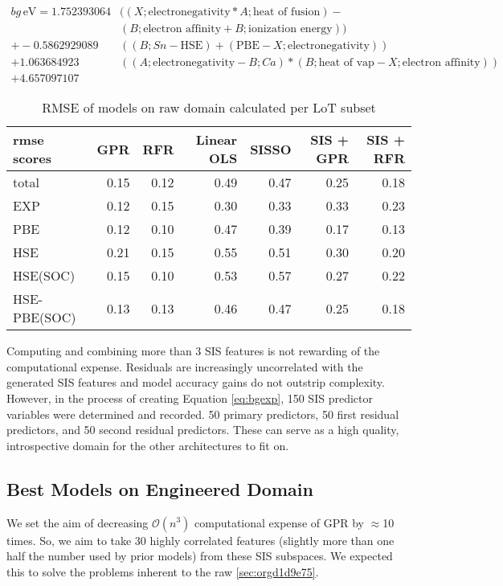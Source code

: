 \begin{align}
\label{eq:bgexp}
bg\,\si{\electronvolt} = 1.752393064 &((X;\mbox{electronegativity}*A;\mbox{heat of fusion})-\nonumber\\&(B;\mbox{electron affinity}+B;\mbox{ionization energy}))\nonumber\\+-0.5862929089 &((B;Sn-\mbox{HSE})+(\mbox{PBE}-X;\mbox{electronegativity}))\nonumber\\+1.063684923 &((A;\mbox{electronegativity}-B;Ca)*(B;\mbox{heat of vap}-X;\mbox{electron affinity}))\nonumber\\+4.657097107
\end{align}

\begin{table}[htbp]
\caption{\label{tbl:LoTscores} RMSE of models on raw domain calculated per LoT subset}
\centering
\begin{tabular}{lrrrrrr}
rmse scores & GPR & RFR & Linear OLS & SISSO & SIS + GPR & SIS + RFR\\[0pt]
\hline
total & 0.15 & 0.12 & 0.49 & 0.47 & 0.25 & 0.18\\[0pt]
EXP & 0.12 & 0.15 & 0.30 & 0.33 & 0.33 & 0.23\\[0pt]
PBE & 0.12 & 0.10 & 0.47 & 0.39 & 0.17 & 0.13\\[0pt]
HSE & 0.21 & 0.15 & 0.55 & 0.51 & 0.30 & 0.20\\[0pt]
HSE(SOC) & 0.15 & 0.10 & 0.53 & 0.57 & 0.27 & 0.22\\[0pt]
HSE-PBE(SOC) & 0.13 & 0.13 & 0.46 & 0.47 & 0.25 & 0.18\\[0pt]
\end{tabular}
\end{table}

Computing and combining more than 3 SIS features is not rewarding of the computational expense.
Residuals are increasingly uncorrelated with the generated SIS features and model accuracy gains do not outstrip complexity.
However, in the process of creating Equation \ref{eq:bgexp}, 150 SIS predictor variables were determined and recorded.
50 primary predictors, 50 first residual predictors, and 50 second residual predictors.
These can serve as a high quality, introspective domain for the other architectures to fit on.

\subsection{Best Models on Engineered Domain}
\label{sec:org7802582}
We set the aim of decreasing \(\mathcal{O}(n^3)\) computational expense of GPR by \(\approx\)10 times.
So, we aim to take 30 highly correlated features (slightly more than one half the number used by prior models) from these SIS subspaces.
We expected this to solve the problems inherent to the raw \ref{sec:orgd1d9e75}.

